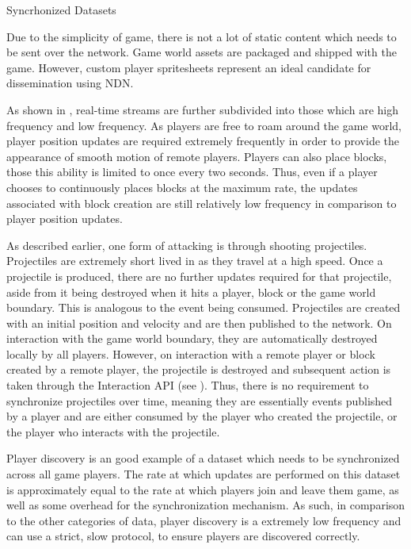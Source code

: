 \begin{labeling}{Syncrhonized Datasets }
    \item[Static Content] Due to the simplicity of game, there is not a lot of static content which needs to be sent over the network. Game world assets are packaged and shipped with the game. However, custom player spritesheets represent an ideal candidate for dissemination using NDN. 
    \item[Realtime Streams] As shown in , real-time streams are further subdivided into those which are high frequency and low frequency.\break\break
    As players are free to roam around the game world, player position updates are required extremely frequently in order to provide the appearance of smooth motion of remote players.\break\break
    Players can also place blocks, those this ability is limited to once every two seconds. Thus, even if a player chooses to continuously places blocks at the maximum rate, the updates associated with block creation are still relatively low frequency in comparison to player position updates.
    \item[Non Synced] As described earlier, one form of attacking is through shooting projectiles. Projectiles are extremely short lived in \game{} as they travel at a high speed. Once a projectile is produced, there are no further updates required for that projectile, aside from it being destroyed when it hits a player, block or the game world boundary. This is analogous to the event being consumed. Projectiles are created with an initial position and velocity and are then published to the network. On interaction with the game world boundary, they are automatically destroyed locally by all players. However, on interaction with a remote player or block created by a remote player, the projectile is destroyed and subsequent action is taken through the Interaction API (see ). Thus, there is no requirement to synchronize projectiles over time, meaning they are essentially events published by a player and are either consumed by the player who created the projectile, or the player who interacts with the projectile.
    \item[Syncrhonized Datasets] Player discovery is an good example of a dataset which needs to be synchronized across all game players. The rate at which updates are performed on this dataset is approximately equal to the rate at which players join and leave them game, as well as some overhead for the synchronization mechanism. As such, in comparison to the other categories of data, player discovery is a extremely low frequency and can use a strict, slow protocol, to ensure players are discovered correctly.            
\end{labeling}

